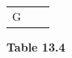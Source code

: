 {{\begin{center}
\begin{tabular}[t]{|l|l|l|}
     \tabularnewline\cline{1-1}\cline{2-2}\cline{3-3}
    
    
        G &
    
    
         &
    
    
     \tabularnewline\cline{1-1}\cline{2-2}\cline{3-3}
    \end{tabular}
      \end{center}
    \begin{center}{\small\bfseries Table 13.4}\end{center}
    
    \addtocounter{footnote}{-0}
    
          }{ %
        
    
        \begin{center}
      
      \label{m39358*id70670}
      
    \noindent
      \tablelasttail{}
      \begin{xtabular}[t]{|l|l|l|}\hline
    

\end{xtabular}
\end{center}}}
